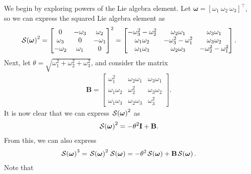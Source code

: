 We begin by exploring powers of the Lie algebra element. Let $\boldsymbol{\omega} = [\omega_1\ \omega_2\ \omega_3]^\top$, so we can express the squared Lie algebra element as
\begin{align}
    \SL[\boldsymbol{\omega}]^2 = \begin{bmatrix}
        0 & -\omega_3 & \omega_2\\
        \omega_3 & 0 & -\omega_1 \\
        -\omega_2 & \omega_1 & 0
    \end{bmatrix}^2 = 
    \begin{bmatrix}
        -\omega_3^2-\omega_2^2 & \omega_2\omega_1 & \omega_3\omega_1\\
        \omega_1\omega_2 & -\omega_3^2-\omega_1^2 & \omega_3\omega_2 \\
        \omega_1\omega_3 & \omega_2\omega_3 & -\omega_2^2-\omega_1^2
    \end{bmatrix}.
\end{align}
Next, let $\theta=\sqrt{\omega_1^2+\omega_2^2+\omega_3^2}$, and consider the matrix
\begin{align}
    \mathbf{B} = \begin{bmatrix}
        \omega_1^2 & \omega_2\omega_1 & \omega_3\omega_1\\
        \omega_1\omega_2 & \omega_2^2 & \omega_3\omega_2 \\
        \omega_1\omega_3 & \omega_2\omega_3 & \omega_3^2
    \end{bmatrix}.
\end{align}
It is now clear that we can express $\SL[\boldsymbol{\omega}]^2$ as
\begin{align}
    \SL[\boldsymbol{\omega}]^2 = -\theta^2\mathbf{I} + \mathbf{B}.
\end{align}
From this, we can also express
\begin{align}
    \SL[\boldsymbol{\omega}]^3 = \SL[\boldsymbol{\omega}]^2\SL[\boldsymbol{\omega}] = -\theta^2\SL[\boldsymbol{\omega}] + \mathbf{B}\SL[\boldsymbol{\omega}].
\end{align}
Note that
